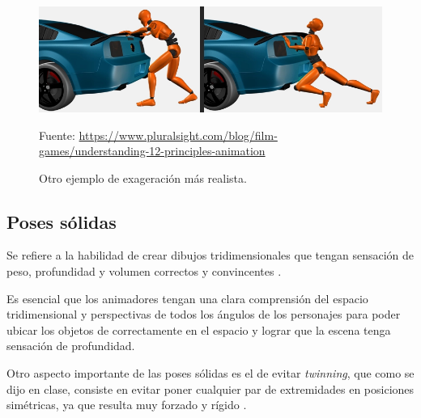 \documentclass{article}
\begin{document}
\begin{figure}[H]
    \centering
    \includegraphics[width=\textwidth]{imagenes/Exaggeration.png}
    \caption{Otro ejemplo de exageración más realista.}
    \vspace{10pt}
    \footnotesize{Fuente: \url{https://www.pluralsight.com/blog/film-games/understanding-12-principles-animation}}
\end{figure}

\subsection{Poses sólidas}

Se refiere a la habilidad de crear dibujos tridimensionales que tengan sensación de peso, profundidad y volumen correctos y convincentes \cite{plural}.

\bigskip

Es esencial que los animadores tengan una clara comprensión del espacio tridimensional y perspectivas de todos los ángulos de los personajes para poder ubicar los objetos de correctamente en el espacio y lograr que la escena tenga sensación de profundidad.

\bigskip

Otro aspecto importante de las poses sólidas es el de evitar \textit{twinning}, que como se dijo en clase, consiste en evitar poner cualquier par de extremidades en posiciones simétricas, ya que resulta muy forzado y rígido \cite{plural}.
\end{document}
